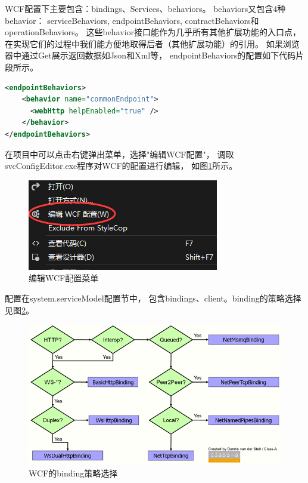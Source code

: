 \documentclass{book}
\begin{document}
WCF配置下主要包含：bindings、Services、behaviors。
behaviors又包含4种behavior：
serviceBehaviors, endpointBehaviors, contractBehaviors和operationBehaviors。
这些behavior接口能作为几乎所有其他扩展功能的入口点，
在实现它们的过程中我们能方便地取得后者（其他扩展功能）的引用。
如果浏览器中通过Get展示返回数据如Json和Xml等，
endpointBehaviors的配置如下代码片段所示。

\begin{lstlisting}[language=XML]
<endpointBehaviors>
	<behavior name="commonEndpoint">
	  <webHttp helpEnabled="true" />
	</behavior>
</endpointBehaviors>
\end{lstlisting}

在项目中可以点击右键弹出菜单，选择"编辑WCF配置"，
调取svcConfigEditor.exe程序对WCF的配置进行编辑，
如图\ref{fig:EditWCFConfig}所示。

\begin{figure}[htbp]
	\centering
	\includegraphics[scale=1]{EditWCFConfig.jpg}
	\caption{编辑WCF配置菜单}
	\label{fig:EditWCFConfig}
\end{figure}

配置在system.serviceModel配置节中，
包含bindings、client。binding的策略选择见图\ref{fig:WCFChoseaBindingStategy}。

\begin{figure}[htbp]
	\centering
	\includegraphics[scale=0.5]{WCFChoseaBindingStategy.png}
	\caption{WCF的binding策略选择}
	\label{fig:WCFChoseaBindingStategy}
\end{figure}
\end{document}
